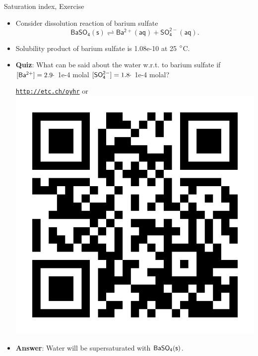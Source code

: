 \begin{frame}{Saturation index, Exercise}
	
%	

	\begin{itemize}
		\item Consider dissolution reaction of barium sulfate 
		\[
		\mathsf{BaSO_4(s) \rightleftharpoons Ba^{2+}(aq) + SO_4^{2-}(aq).}
		\]
		\item Solubility product of barium sulfate is 1.08e-10 at 25 ${\rm ^\circ}$C.
		\item  \alert{\bf Quiz}: What can be said about the water w.r.t. to barium sulfate if \\
		${\sf [Ba^{2+}}]=2.9 \cdot$ 1e-4 molal
		${\sf [SO_4^{2-}]}=1.8 \cdot$ 1e-4 molal?
		\begin{center}
			\href{http://etc.ch/oyhr}{\textcolor{indigo(dye)}{\tt http://etc.ch/oyhr}} 
			\quad
			or 
			\quad
			\includegraphics[height=0.2\columnwidth]{figures/chemical-equilibrium/poll-mass-balance.png}
		\end{center}
		\hiddenpause
		\item {\bf Answer}: Water will be supersaturated with ${\sf BaSO_4(s)}$.
	\end{itemize}

\end{frame}
%
%
